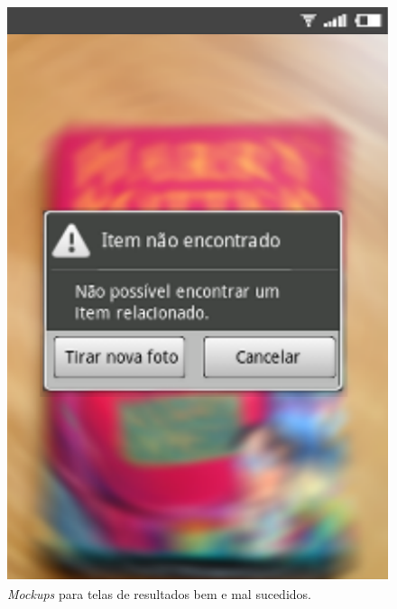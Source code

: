 \begin{figure}[ht]
\begin{minipage}{.5\textwidth}
            \includegraphics[scale=1]{tela/TelaErro}
        \end{minipage}
        \caption{ \label{fig:TelaHarryPotter} \textit{Mockups} para telas de 
            resultados bem e mal sucedidos. }
\end{figure}
